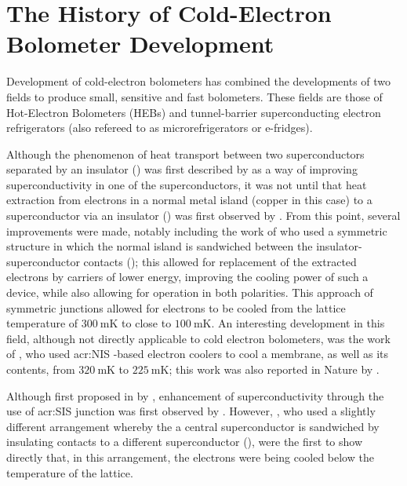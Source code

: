 \section{The History of Cold-Electron Bolometer Development}\label{sec:history}
Development of cold-electron bolometers has combined the developments of two fields to produce small, sensitive and fast bolometers. These fields are those of Hot-Electron Bolometers (HEBs) and tunnel-barrier superconducting electron refrigerators (also refereed to as microrefrigerators or e-fridges).
\par 
Although the phenomenon of heat transport between two superconductors separated by an insulator () was first described by \textcite{Parmenter1961} as a way of improving superconductivity in one of the superconductors, it was not until \citeyear{Nahum1994} that heat extraction from electrons in a normal metal island (copper in this case) to a superconductor via an insulator () was first observed by \textcite{Nahum1994}. From this point, several improvements were made, notably including the work of \textcite{Levio1996} who used a symmetric structure in which the normal island is sandwiched between the insulator-superconductor contacts (); this allowed for replacement of the extracted electrons by carriers of lower energy, improving the cooling power of such a device, while also allowing for operation in both polarities. This approach of symmetric junctions allowed for electrons to be cooled from the lattice temperature of $300~\mathrm{mK}$ to close to $100~\mathrm{mK}$. An interesting development in this field, although not directly applicable to cold electron bolometers, was the work of \textcite{Clark2005}, who used \gls{acr:NIS} -based electron coolers to cool a membrane, as well as its contents, from $320~\mathrm{mK}$ to $225~\mathrm{mK}$; this work was also reported in Nature by \textcite{Pekola2005}.
\par 
Although first proposed in \citeyear{Parmenter1961} by \citeauthor{Parmenter1961}, enhancement of superconductivity through the use of \gls{acr:SIS} junction was first observed by \textcite{Chi1979}. However, \textcite{Manninen1999}, who used a slightly different arrangement whereby the a central superconductor is sandwiched by insulating contacts to a different superconductor (), were the first to show directly that, in this arrangement, the electrons were being cooled below the temperature of the lattice.
\par 
